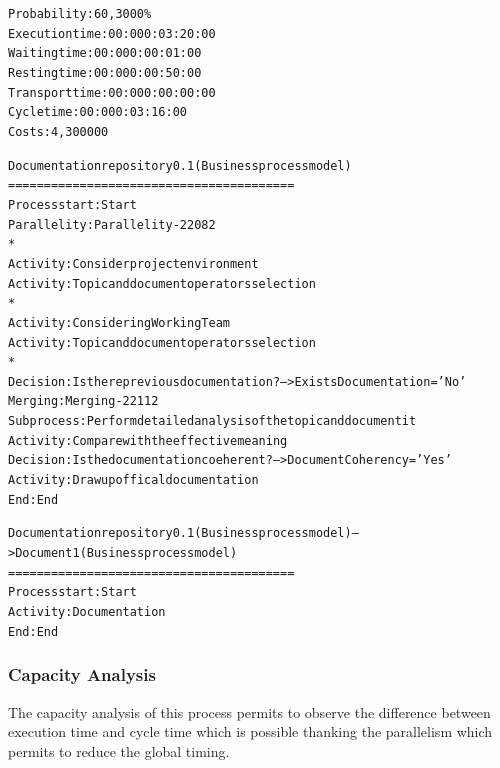\begin{alltt}
Probability:   60,3000\%
Execution time:  00:000:03:20:00
Waiting time:  00:000:00:01:00
Resting time:  00:000:00:50:00
Transport time:  00:000:00:00:00
Cycle time:  00:000:03:16:00
Costs:  4,300000

Documentation repository 0.1 (Business process model)
========================================
Process start: Start
Parallelity: Parallelity-22082
    *
    Activity: Consider project environment
    Activity: Topic and document operators selection 
    *
    Activity: Considering Working Team
    Activity: Topic and document operators selection 
    *
    Decision: Is there previous documentation? --> ExistsDocumentation='No'
Merging: Merging-22112
Subprocess: Perform detailed analysis of the topic and document it
Activity: Compare with the effective meaning
Decision: Is the documentation coeherent? --> DocumentCoherency='Yes'
Activity: Draw up offical documentation
End: End

Documentation repository 0.1 (Business process model) --> Document 1 (Business process model)
========================================
Process start: Start
Activity: Documentation
End: End
\end{alltt}


\subsubsection{Capacity Analysis}
The capacity analysis of this process permits to observe the difference between execution time and cycle time which is possible thanking the parallelism which permits to reduce the global timing.

